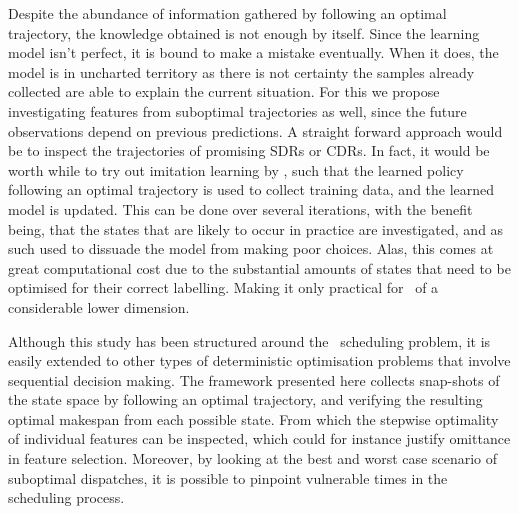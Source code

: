 Despite the abundance of information gathered by following an optimal 
trajectory, the knowledge obtained is not enough by itself. Since the learning 
model isn't perfect, it is bound to make a mistake eventually. When it does, 
the model is in uncharted  territory as there is not certainty the samples 
already collected are able to explain the current situation. For this we 
propose investigating features from suboptimal trajectories as well, since the 
future observations depend on previous predictions. 
A straight forward approach would be to inspect 
the trajectories of promising SDRs or CDRs. 
In fact, it would be worth while to try out imitation learning by 
\cite{RossB10,RossGB11}, such that the learned policy following an optimal 
trajectory is used to collect training data, and the learned model is updated. 
This can be done over several iterations, with the benefit being, that the 
states that are likely to occur in practice are investigated, and as such used 
to dissuade the model from making poor choices. Alas, this comes at great 
computational cost due to the substantial amounts of states that need to be 
optimised for their correct labelling. Making it only practical for \jsp\ of 
a considerable lower dimension. 

Although this study has been structured around the \jsp\ scheduling problem, 
it is easily extended to other types of deterministic optimisation problems 
that involve sequential decision making. 
The framework presented here collects snap-shots of the state space by 
following an optimal trajectory, and verifying the resulting optimal makespan 
from each possible state. 
From which the stepwise optimality of individual features can be inspected, 
which could for instance justify omittance in feature selection. 
Moreover, by looking at the best and worst case scenario of suboptimal 
dispatches, it is possible to pinpoint vulnerable times in the scheduling 
process. 


